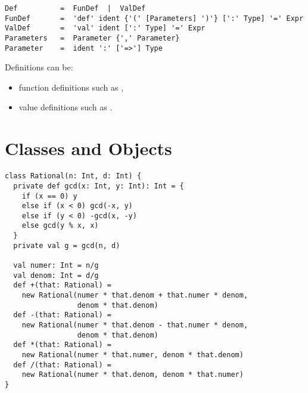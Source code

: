 
\begin{lstlisting}
Def          =  FunDef  |  ValDef
FunDef       =  'def' ident {'(' [Parameters] ')'} [':' Type] '=' Expr
ValDef       =  'val' ident [':' Type] '=' Expr
Parameters   =  Parameter {',' Parameter}
Parameter    =  ident ':' ['=>'] Type
\end{lstlisting}
Definitions can be:
\begin{itemize}
\item
function definitions such as ,
\item
value definitions such as .
\end{itemize}

\chapter{Classes and Objects}
\label{chap:classes}


\begin{lstlisting}
class Rational(n: Int, d: Int) {
  private def gcd(x: Int, y: Int): Int = {
    if (x == 0) y
    else if (x < 0) gcd(-x, y)
    else if (y < 0) -gcd(x, -y)
    else gcd(y % x, x)
  }
  private val g = gcd(n, d)

  val numer: Int = n/g
  val denom: Int = d/g
  def +(that: Rational) =
    new Rational(numer * that.denom + that.numer * denom,
                 denom * that.denom)
  def -(that: Rational) =
    new Rational(numer * that.denom - that.numer * denom, 
                 denom * that.denom)
  def *(that: Rational) =
    new Rational(numer * that.numer, denom * that.denom)
  def /(that: Rational) =
    new Rational(numer * that.denom, denom * that.numer)
}
\end{lstlisting}

